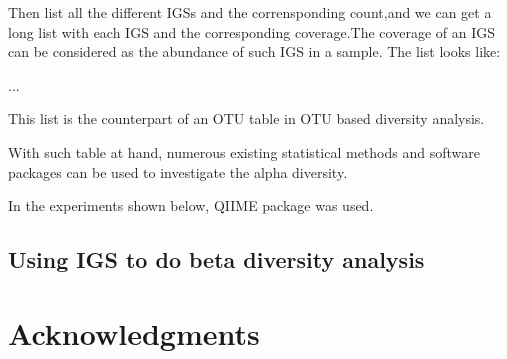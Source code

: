 \documentclass{article}
\begin{document}
Then list all the different IGSs and the corrensponding count,and we can get a long list with each IGS and the corresponding coverage.The coverage of an IGS can be considered as the abundance of such IGS in a sample. The list looks like:

    ...
  
This list is the counterpart of an OTU table in OTU based diversity analysis.

With such table at hand, numerous existing statistical methods and software packages can be used to investigate the alpha diversity.  

In the experiments shown below, QIIME package was used. 



\subsection{Using IGS to do beta diversity analysis}


\section{Acknowledgments}
\end{document}
